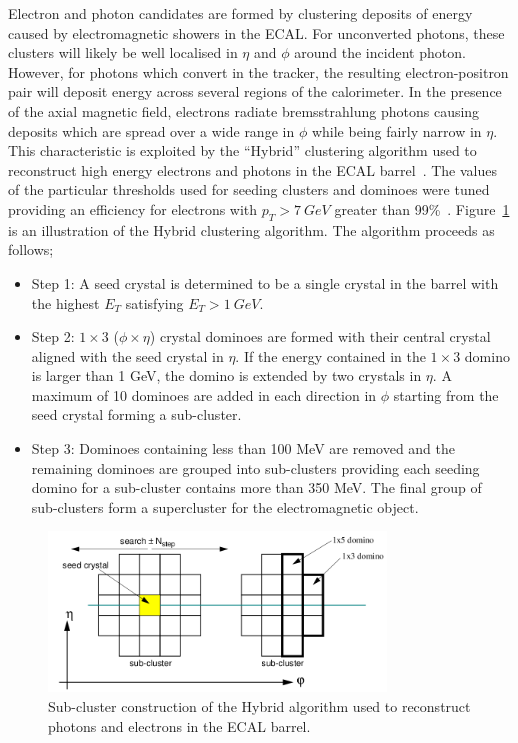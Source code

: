 Electron and photon candidates are formed by clustering deposits of 
energy caused by electromagnetic showers in the ECAL. For unconverted 
photons, these clusters will likely be well localised in $\eta$ and $\phi$
around the incident photon. However, for photons which convert in the tracker,
the resulting electron-positron pair will deposit energy across several regions
of the calorimeter. In the presence of the axial magnetic field, 
electrons radiate bremsstrahlung photons causing deposits which are 
spread over a wide range in $\phi$ while being fairly narrow in $\eta$.
This characteristic is exploited by the ``Hybrid'' clustering algorithm 
used to reconstruct high energy electrons and photons in
the ECAL barrel~\citep{cseez}. 
The values of the particular thresholds used for seeding clusters and dominoes were tuned providing
an efficiency for electrons with $p_{T}>7~GeV$ greater than 99\%~\citep{dfutyan}.
Figure~\ref{fig:hybridclustering} is an illustration of the Hybrid clustering algorithm.
The algorithm proceeds as follows;
\begin{itemize}
 \item Step 1: A seed crystal is determined to be a single crystal in the barrel with the highest
 $E_{T}$ satisfying $E_{T}>1~GeV$.
 \item Step 2: $1\times3$ ($\phi\times\eta$) crystal dominoes are formed with their central crystal 
 aligned with the seed crystal in $\eta$. If the energy contained in the $1\times3$ domino is 
 larger than 1 GeV, the domino is extended by two crystals in $\eta$. A maximum of 10 dominoes are 
 added in each direction in $\phi$ starting from the seed crystal forming a sub-cluster.
 \item Step 3: Dominoes containing less than 100 MeV are removed and the remaining dominoes are 
 grouped into sub-clusters providing each seeding domino for a sub-cluster contains more than 350 MeV. 
 The final group of sub-clusters form a supercluster for the electromagnetic object.
\end{itemize}

\begin{figure}
\begin{center}
	\includegraphics[width=0.8\textwidth]{detector/ecal/clustering.png}
	\caption{Sub-cluster construction of the Hybrid algorithm used to reconstruct photons and 
	electrons in the ECAL barrel.}
	\label{fig:hybridclustering}
\end{center}
\end{figure}


